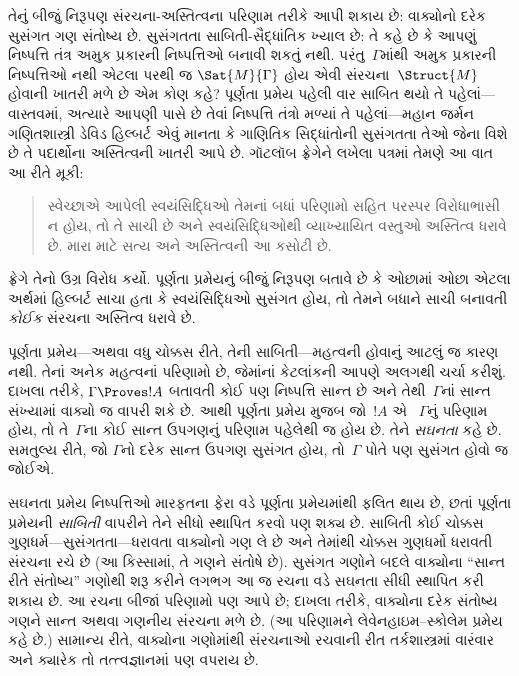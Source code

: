 તેનું બીજું નિરૂપણ સંરચના-અસ્તિત્વના પરિણામ તરીકે આપી શકાય છે:
વાક્યોનો દરેક સુસંગત ગણ સંતોષ્ય છે. સુસંગતતા સાબિતી-સૈદ્ધાંતિક
ખ્યાલ છે: તે કહે છે કે આપણું નિષ્પત્તિ તંત્ર અમુક પ્રકારની
નિષ્પત્તિઓ બનાવી શકતું નથી. પરંતુ~$\Gamma$માંથી અમુક પ્રકારની
નિષ્પત્તિઓ નથી એટલા પરથી જ $\Sat{M}{\Gamma}$
હોય એવી સંરચના~$\Struct{M}$
હોવાની ખાતરી મળે છે એમ કોણ કહે? પૂર્ણતા પ્રમેય પહેલી વાર સાબિત થયો
તે પહેલાં—વાસ્તવમાં, અત્યારે આપણી પાસે છે તેવાં નિષ્પત્તિ તંત્રો
મળ્યાં તે પહેલાં—મહાન જર્મન ગણિતશાસ્ત્રી ડેવિડ હિલ્બર્ટ એવું માનતા કે
ગાણિતિક સિદ્ધાંતોની સુસંગતતા તેઓ જેના વિશે છે તે પદાર્થોના અસ્તિત્વની
ખાતરી આપે છે. ગૉટલૉબ ફ્રેગેને લખેલા પત્રમાં તેમણે આ વાત આ રીતે મૂકી:
\begin{quote}
  સ્વેચ્છાએ આપેલી સ્વયંસિદ્ધિઓ તેમનાં બધાં પરિણામો સહિત પરસ્પર
  વિરોધાભાસી ન હોય, તો તે સાચી છે અને સ્વયંસિદ્ધિઓથી વ્યાખ્યાયિત
  વસ્તુઓ અસ્તિત્વ ધરાવે છે. મારા માટે સત્ય અને અસ્તિત્વની આ કસોટી છે.
\end{quote}
ફ્રેગે તેનો ઉગ્ર વિરોધ કર્યો. પૂર્ણતા પ્રમેયનું બીજું નિરૂપણ બતાવે છે
કે ઓછામાં ઓછા એટલા અર્થમાં હિલ્બર્ટ સાચા હતા કે સ્વયંસિદ્ધિઓ સુસંગત
હોય, તો તેમને બધાને સાચી બનાવતી \emph{કોઈક}
સંરચના અસ્તિત્વ ધરાવે છે.

પૂર્ણતા પ્રમેય—અથવા વધુ ચોક્કસ રીતે, તેની સાબિતી—મહત્વની હોવાનું આટલું
જ કારણ નથી. તેનાં અનેક મહત્વનાં પરિણામો છે, જેમાંનાં કેટલાંકની આપણે
અલગથી ચર્ચા કરીશું. દાખલા તરીકે, $\Gamma \Proves !A$ બતાવતી કોઈ પણ
નિષ્પત્તિ સાન્ત છે અને તેથી~$\Gamma$નાં સાન્ત સંખ્યામાં
વાક્યો જ વાપરી શકે છે. આથી પૂર્ણતા પ્રમેય મુજબ જો~$!A$ એ
~$\Gamma$નું પરિણામ હોય, તો તે~$\Gamma$ના કોઈ સાન્ત ઉપગણનું પરિણામ
પહેલેથી જ હોય છે. તેને \emph{સઘનતા} કહે છે. સમતુલ્ય રીતે, જો
$\Gamma$નો દરેક સાન્ત ઉપગણ સુસંગત હોય, તો~$\Gamma$ પોતે પણ સુસંગત
હોવો જ જોઈએ.

સઘનતા પ્રમેય નિષ્પત્તિઓ મારફતના ફેરા વડે પૂર્ણતા પ્રમેયમાંથી
ફલિત થાય છે, છતાં પૂર્ણતા પ્રમેયની \emph{સાબિતી} વાપરીને તેને સીધો
સ્થાપિત કરવો પણ શક્ય છે. સાબિતી કોઈ ચોક્કસ ગુણધર્મ—સુસંગતતા—ધરાવતા
વાક્યોનો ગણ લે છે અને તેમાંથી ચોક્કસ ગુણધર્મો ધરાવતી
સંરચના રચે છે (આ કિસ્સામાં, તે ગણને સંતોષે છે). સુસંગત ગણોને
બદલે વાક્યોના ``સાન્ત રીતે સંતોષ્ય'' ગણોથી શરૂ કરીને લગભગ આ જ
રચના વડે સઘનતા સીધી સ્થાપિત કરી શકાય છે.
આ રચના બીજાં પરિણામો પણ આપે છે; દાખલા તરીકે,
  વાક્યોના દરેક સંતોષ્ય ગણને સાન્ત અથવા ગણનીય
  સંરચના મળે છે. (આ પરિણામને લેવેનહાઇમ--સ્કોલેમ પ્રમેય કહે છે.)
  સામાન્ય રીતે, વાક્યોના ગણોમાંથી સંરચનાઓ રચવાની રીત
  તર્કશાસ્ત્રમાં વારંવાર અને ક્યારેક તો તત્ત્વજ્ઞાનમાં પણ વપરાય છે.
\endgroup


